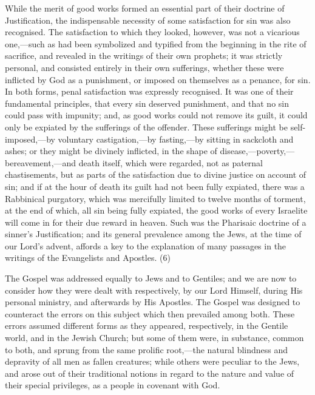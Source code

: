 \documentclass[
]{book}
\begin{document}
While the merit of good works formed an essential part of their doctrine of Justification, the indispensable necessity of some satisfaction for sin was also recognised. The satisfaction to which they looked, however, was not a vicarious one,---such as had been symbolized and typified from the beginning in the rite of sacrifice, and revealed in the writings of their own prophets; it was strictly personal, and consisted entirely in their own sufferings, whether these were inflicted by God as a punishment, or imposed on themselves as a penance, for sin. In both forms, penal satisfaction was expressly recognised. It was one of their fundamental principles, that every sin deserved punishment, and that no sin could pass with impunity; and, as good works could not remove its guilt, it could only be expiated by the sufferings of the offender. These sufferings might be self-imposed,---by voluntary castigation,---by fasting,---by sitting in sackcloth and ashes; or they might be divinely inflicted, in the shape of disease,---poverty,---bereavement,---and death itself, which were regarded, not as paternal chastisements, but as parts of the satisfaction due to divine justice on account of sin; and if at the hour of death its guilt had not been fully expiated, there was a Rabbinical purgatory, which was mercifully limited to twelve months of torment, at the end of which, all sin being fully expiated, the good works of every Israelite will come in for their due reward in heaven. Such was the Pharisaic doctrine of a sinner's Justification; and its general prevalence among the Jews, at the time of our Lord's advent, affords a key to the explanation of many passages in the writings of the Evangelists and Apostles. (6)

The Gospel was addressed equally to Jews and to Gentiles; and we are now to consider how they were dealt with respectively, by our Lord Himself, during His personal ministry, and afterwards by His Apostles. The Gospel was designed to counteract the errors on this subject which then prevailed among both. These errors assumed different forms as they appeared, respectively, in the Gentile world, and in the Jewish Church; but some of them were, in substance, common to both, and sprung from the same prolific root,---the natural blindness and depravity of all men as fallen creatures; while others were peculiar to the Jews, and arose out of their traditional notions in regard to the nature and value of their special privileges, as a people in covenant with God.
\end{document}
